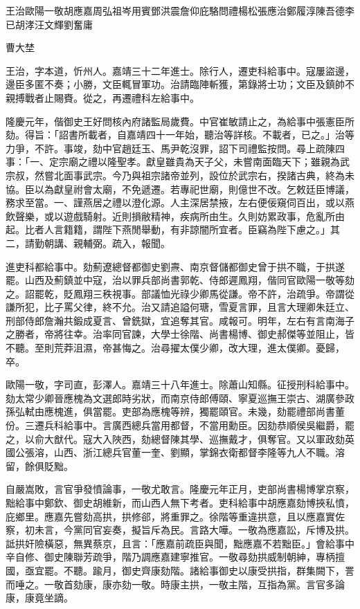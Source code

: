 
\begin{pinyinscope}
王治歐陽一敬胡應嘉周弘祖岑用賓鄧洪震詹仰庇駱問禮楊松張應治鄭履淳陳吾德李已胡涍汪文輝劉奮庸{{曹大埜

王治，字本道，忻州人。嘉靖三十二年進士。除行人，遷吏科給事中。寇屢盜邊，邊臣多匿不奏；小勝，文臣輒冒軍功。治請臨陣斬獲，第錄將士功；文臣及鎮帥不親搏戰者止賜賚。從之，再遷禮科左給事中。

隆慶元年，偕御史王好問核內府諸監局歲費。中官崔敏請止之，為給事中張憲臣所劾。得旨：「詔書所載者，自嘉靖四十一年始，聽治等詳核。不載者，已之。」治等力爭，不許。事竣，劾中官趙廷玉、馬尹乾沒罪，詔下司禮監按問。尋上疏陳四事：「一、定宗廟之禮以隆聖孝。獻皇雖貴為天子父，未嘗南面臨天下；雖親為武宗叔，然嘗北面事武宗。今乃與祖宗諸帝並列，設位於武宗右，揆諸古典，終為未協。臣以為獻皇祔會太廟，不免遞遷。若專祀世廟，則億世不改。乞敕廷臣博議，務求至當。一、謹燕居之禮以澄化源。人主深居禁掖，左右便佞窺伺百出，或以燕飲聲樂，或以遊戲騎射。近則損敝精神，疾病所由生。久則妨累政事，危亂所由起。比者人言籍籍，謂陛下燕閒舉動，有非諒闇所宜者。臣竊為陛下慮之。」其二，請勤朝講、親輔弼。疏入，報聞。

進吏科都給事中。劾薊遼總督都御史劉燾、南京督儲都御史曾于拱不職，于拱遂罷。山西及薊鎮並中寇，治以罪兵部尚書郭乾、侍郎遲鳳翔，偕同官歐陽一敬等劾之。詔罷乾，貶鳳翔三秩視事。部議恤光祿少卿馬從謙。帝不許，治疏爭。帝謂從謙所犯，比子罵父律，終不允。治又請追謚何瑭，雪夏言罪，且言大理卿朱廷立、刑部侍郎詹瀚共鍛成夏言、曾銑獄，宜追奪其官。咸報可。明年，左右有言南海子之勝者，帝將往幸。治率同官諫，大學士徐階、尚書楊博、御史郝傑等並阻止，皆不聽。至則荒莽沮濕，帝甚悔之。治尋擢太僕少卿，改大理，進太僕卿。憂歸，卒。

歐陽一敬，字司直，彭澤人。嘉靖三十八年進士。除蕭山知縣。征授刑科給事中。劾太常少卿晉應槐為文選郎時劣狀，而南京侍郎傅頤、寧夏巡撫王崇古、湖廣參政孫弘軾由應槐進，俱當罷。吏部為應槐等辨，獨罷頤官。未幾，劾罷禮部尚書董份。三遷兵科給事中。言廣西總兵當用都督，不當用勳臣。因劾恭順侯吳繼爵，罷之，以俞大猷代。寇大入陜西，劾總督陳其學、巡撫戴才，俱奪官。又以軍政劾英國公張溶，山西、浙江總兵官董一奎、劉顯，掌錦衣衛都督李隆等九人不職。溶留，餘俱貶黜。

自嚴嵩敗，言官爭發憤論事，一敬尤敢言。隆慶元年正月，吏部尚書楊博掌京察，黜給事中鄭欽、御史胡維新，而山西人無下考者。吏科給事中胡應嘉劾博挾私憤，庇鄉里。應嘉先嘗劾高拱，拱修郤，將重罪之。徐階等重違拱意，且以應嘉實佐察，初未言，今黨同官妄奏，擬旨斥為民。言路大嘩。一敬為應嘉訟，斥博及拱。詆拱奸險橫惡，無異蔡京，且言：「應嘉前疏臣與聞，黜應嘉不若黜臣。」會給事中辛自修、御史陳聯芳疏爭，階乃調應嘉建寧推官。一敬尋劾拱威制朝紳，專柄擅國，亟宜罷。不聽。踰月，御史齊康劾階。諸給事御史以康受拱指，群集闕下，詈而唾之。一敬首劾康，康亦劾一敬。時康主拱，一敬主階，互指為黨。言官多論康，康竟坐謫。

}}
\end{pinyinscope}
